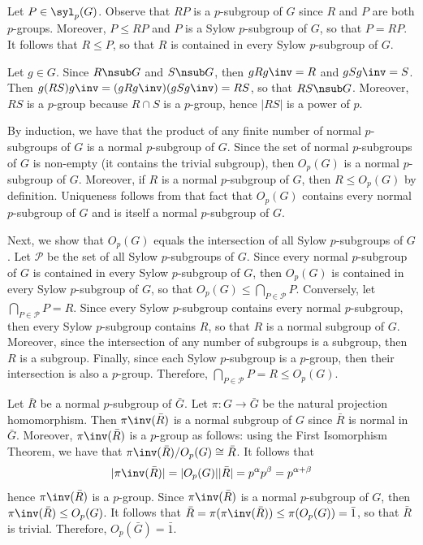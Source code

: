 \begin{solalph}
	\item Let $P \in \syl_p(G)$. Observe that $RP$ is a $p$-subgroup of $G$ since $R$ and $P$ are both $p$-groups. Moreover, $P \leq RP$ and $P$ is a Sylow $p$-subgroup of $G$, so that $P = RP$. It follows that $R \leq P$, so that $R$ is contained in every Sylow $p$-subgroup of $G$.
	\item Let $g \in G$. Since $R \nsub G$ and $S \nsub G$, then $gRg\inv = R$ and $gSg\inv = S$. Then $g(RS)g\inv = (gRg\inv)(gSg\inv) = RS$, so that $RS \nsub G$. Moreover, $RS$ is a $p$-group because $R \cap S$ is a $p$-group, hence $|RS|$ is a power of $p$.
	\item By induction, we have that the product of any finite number of normal $p$-subgroups of $G$ is a normal $p$-subgroup of $G$. Since the set of normal $p$-subgroups of $G$ is non-empty (it contains the trivial subgroup), then $O_p(G)$ is a normal $p$-subgroup of $G$. Moreover, if $R$ is a normal $p$-subgroup of $G$, then $R \leq O_p(G)$ by definition. Uniqueness follows from that fact that $O_p(G)$ contains every normal $p$-subgroup of $G$ and is itself a normal $p$-subgroup of $G$.
	
	Next, we show that $O_p(G)$ equals the intersection of all Sylow $p$-subgroups of $G$. Let $\mathcal P$ be the set of all Sylow $p$-subgroups of $G$. Since every normal $p$-subgroup of $G$ is contained in every Sylow $p$-subgroup of $G$, then $O_p(G)$ is contained in every Sylow $p$-subgroup of $G$, so that $O_p(G) \leq \bigcap_{P \in \mathcal P} P$. Conversely, let $\bigcap_{P \in \mathcal P} P = R$. Since every Sylow $p$-subgroup contains every normal $p$-subgroup, then every Sylow $p$-subgroup contains $R$, so that $R$ is a normal subgroup of $G$. Moreover, since the intersection of any number of subgroups is a subgroup, then $R$ is a subgroup. Finally, since each Sylow $p$-subgroup is a $p$-group, then their intersection is also a $p$-group. Therefore, $\bigcap_{P \in \mathcal P} P = R \leq O_p(G)$.
	\item Let $\bar R$ be a normal $p$-subgroup of $\bar G$. Let $\pi : G \to \bar G$ be the natural projection homomorphism. Then $\pi\inv(\bar R)$ is a normal subgroup of $G$ since $\bar R$ is normal in $\bar G$. Moreover, $\pi\inv(\bar R)$ is a $p$-group as follows: using the First Isomorphism Theorem, we have that $\pi\inv(\bar R)/O_p(G) \cong \bar R$. It follows that
	\[|\pi\inv(\bar R)| = |O_p(G)||\bar R| = p^\alpha p^\beta = p^{\alpha + \beta}\]
	hence $\pi\inv(\bar R)$ is a $p$-group. Since $\pi\inv(\bar R)$ is a normal $p$-subgroup of $G$, then $\pi\inv(\bar R) \leq O_p(G)$. It follows that $\bar R = \pi(\pi\inv(\bar R)) \leq \pi(O_p(G)) = \bar 1$, so that $\bar R$ is trivial. Therefore, $O_p(\bar G) = \bar 1$.
\end{solalph}


